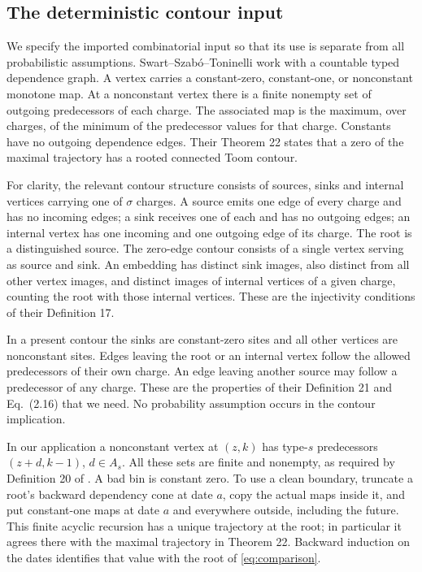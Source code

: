 \subsection{The deterministic contour input}

We specify the imported combinatorial input so that its use is
separate from all probabilistic assumptions. Swart--Szab\'o--Toninelli
\cite[Definitions 15--21 and Theorem 22]{SST} work with a countable
typed dependence graph. A vertex carries a constant-zero,
constant-one, or nonconstant monotone map. At a nonconstant vertex
there is a finite nonempty set of outgoing predecessors of each
charge. The associated map is the maximum, over charges, of the
minimum of the predecessor values for that charge. Constants have
no outgoing dependence edges. Their Theorem 22 states that a zero
of the maximal trajectory has a rooted connected Toom contour.

For clarity, the relevant contour structure consists of sources,
sinks and internal vertices carrying one of \(\sigma\) charges.
A source emits one edge of every charge and has no incoming edges;
a sink receives one of each and has no outgoing edges; an internal
vertex has one incoming and one outgoing edge of its charge.
The root is a distinguished source. The zero-edge contour consists
of a single vertex serving as source and sink. An embedding has
distinct sink images, also distinct from all other vertex images,
and distinct images of internal vertices of a given charge, counting
the root with those internal vertices. These are the injectivity
conditions of their Definition 17.

In a present contour the sinks are constant-zero sites and all other
vertices are nonconstant sites. Edges leaving the root or an
internal vertex follow the allowed predecessors of their own charge.
An edge leaving another source may follow a predecessor of any
charge. These are the properties of their Definition 21 and
Eq.~(2.16) that we need. No probability assumption occurs in the
contour implication.

In our application a nonconstant vertex at \((z,k)\) has type-\(s\)
predecessors \((z+d,k-1)\), \(d\in A_s\). All these sets are finite
and nonempty, as required by Definition 20 of \cite{SST}. A bad bin
is constant zero. To use a clean boundary, truncate a root's backward
dependency cone at date \(a\), copy the actual maps inside it, and
put constant-one maps at date \(a\) and everywhere outside, including
the future. This finite acyclic recursion has a unique trajectory
at the root; in particular it agrees there with the maximal
trajectory in Theorem 22. Backward induction on the dates identifies
that value with the root of \eqref{eq:comparison}.

